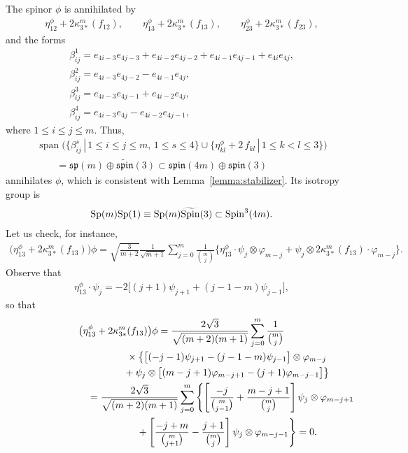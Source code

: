 \documentclass[10pt,a4paper]{amsart}
\numberwithin{equation}{section}
\begin{document}
The spinor $\phi$ is annihilated by
\begin{gather*}
 \eta_{12}^\phi + 2 \kappa_{3*}^m(f_{12}), \qquad
 \eta_{13}^\phi + 2 \kappa_{3*}^m(f_{13}), \qquad
 \eta_{23}^\phi + 2 \kappa_{3*}^m(f_{23}),
\end{gather*}
and the forms
\begin{gather*}
 \beta_{ij}^1 = e_{4i-3}e_{4j-3} + e_{4i-2}e_{4j-2} + e_{4i-1}e_{4j-1} + e_{4i}e_{4j}, \\
 \beta_{ij}^2 = e_{4i-3}e_{4j-2} - e_{4i-1}e_{4j}, \\
 \beta_{ij}^3 = e_{4i-3}e_{4j-1} + e_{4i-2}e_{4j}, \\
 \beta_{ij}^4 = e_{4i-3}e_{4j} - e_{4i-2}e_{4j-1},
\end{gather*}
where $1\leq i\leq j\leq m$. Thus,
\begin{gather*}\operatorname{span}\big( \big\{\beta_{ij}^s \,|\, 1\leq i\leq j\leq m, \,
1\leq s\leq 4\big\}\cup \big\{\eta_{kl}^\phi + 2\,f_{kl}\,|\, 1\leq k<l\leq 3\big\} \big) \\
\qquad {} = \mathfrak{sp}(m) \oplus \widetilde{\mathfrak{spin}}(3) \subset \mathfrak{spin}(4m)\oplus\mathfrak{spin}(3)\end{gather*}
annihilates $\phi$, which is consistent with Lemma~\ref{lemma:stabilizer}. Its isotropy group is
\begin{gather*}{\rm Sp}(m){\rm Sp}(1)\equiv {\rm Sp}(m)\widetilde{\rm Spin}(3)\subset {\rm Spin}^3(4m).\end{gather*}
Let us check, for instance,
\begin{gather*}
\big(\eta_{13}^{\phi}+2\kappa_{3\ast}^{m}(f_{13})\big)\phi
 = \sqrt{\frac{3}{m+2}}\frac{1}{\sqrt{m+1}}\!\sum_{j=0}^{m}\frac{1}{{m\choose
j}}\big \{ \eta_{13}^{\phi}\cdot\psi_j\otimes\varphi_{m-j} + \psi_{j}\otimes
2\kappa_{3\ast}^{m}(f_{13})\cdot\varphi_{m-j}\big \} .
\end{gather*}
Observe that
\begin{gather*}
\eta_{13}^{\phi}\cdot \psi_j = -2\big[(j+1)\psi_{j+1}+(j-1-m)\psi_{j-1}\big],
\end{gather*}
so that
\begin{gather*}
\big(\eta_{13}^{\phi}+2\kappa_{3\ast}^{m}(f_{13})\big)\phi =
 \frac{2\sqrt{3}}{\sqrt{(m+2)(m+1)}}\sum_{j=0}^{m}\frac{1}{{m\choose j}}\\
 \hphantom{\big(\eta_{13}^{\phi}+2\kappa_{3\ast}^{m}(f_{13})\big)\phi =}{}\times
 \big\{
 \big[ (-j-1)\psi_{j+1}-(j-1-m)\psi_{j-1}\big] \otimes\varphi_{m-j}\\
\hphantom{\big(\eta_{13}^{\phi}+2\kappa_{3\ast}^{m}(f_{13})\big)\phi =}{}
 + \psi_{j}\otimes \big[ (m-j+1)\varphi_{m-j+1} -(j+1)\varphi_{m-j-1}\big] \big \} \\
\hphantom{\big(\eta_{13}^{\phi}+2\kappa_{3\ast}^{m}(f_{13})\big)\phi}{}
 =
 \frac{2\sqrt{3}}{\sqrt{(m+2)(m+1)}}\sum_{j=0}^{m}\left\{ \left[\frac{-j}{{m\choose
j-1}}+\frac{m-j+1}{{m\choose j}}\right] \psi_{j}\otimes \varphi_{m-j+1}\right.\\
\left.\hphantom{\big(\eta_{13}^{\phi}+2\kappa_{3\ast}^{m}(f_{13})\big)\phi=}{}
 +\left[ \frac{-j+m}{{m\choose j+1}}-\frac{j+1}{{m\choose j}}\right] \psi_{j}\otimes \varphi_{m-j-1}\right\} = 0.
\end{gather*}
\end{document}
